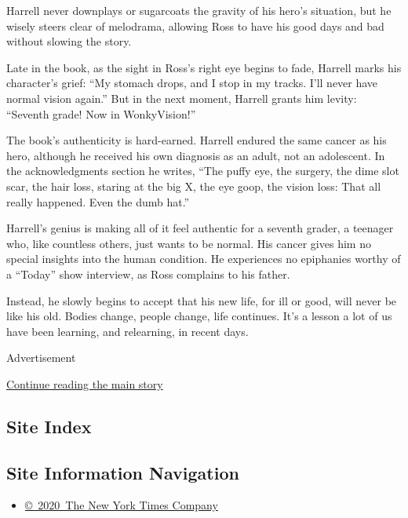 Harrell never downplays or sugarcoats the gravity of his hero's
situation, but he wisely steers clear of melodrama, allowing Ross to
have his good days and bad without slowing the story.

Late in the book, as the sight in Ross's right eye begins to fade,
Harrell marks his character's grief: ``My stomach drops, and I stop in
my tracks. I'll never have normal vision again.'' But in the next
moment, Harrell grants him levity: ``Seventh grade! Now in
WonkyVision!''

The book's authenticity is hard-earned. Harrell endured the same cancer
as his hero, although he received his own diagnosis as an adult, not an
adolescent. In the acknowledgments section he writes, ``The puffy eye,
the surgery, the dime slot scar, the hair loss, staring at the big X,
the eye goop, the vision loss: That all really happened. Even the dumb
hat.''

Harrell's genius is making all of it feel authentic for a seventh
grader, a teenager who, like countless others, just wants to be normal.
His cancer gives him no special insights into the human condition. He
experiences no epiphanies worthy of a ``Today'' show interview, as Ross
complains to his father.

Instead, he slowly begins to accept that his new life, for ill or good,
will never be like his old. Bodies change, people change, life
continues. It's a lesson a lot of us have been learning, and relearning,
in recent days.

Advertisement

\protect\hyperlink{after-bottom}{Continue reading the main story}

\hypertarget{site-index}{%
\subsection{Site Index}\label{site-index}}

\hypertarget{site-information-navigation}{%
\subsection{Site Information
Navigation}\label{site-information-navigation}}

\begin{itemize}
\tightlist
\item
  \href{https://help.nytimes3xbfgragh.onion/hc/en-us/articles/115014792127-Copyright-notice}{©~2020~The
  New York Times Company}
\end{itemize}


